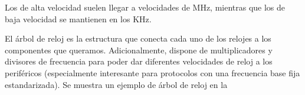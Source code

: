 \documentclass[../main.tex]{subfiles}
\begin{document}
        Los de alta velocidad suelen llegar a velocidades de MHz, mientras que los de baja velocidad se mantienen en los KHz.

        El árbol de reloj es la estructura que conecta cada uno de los relojes a los componentes que queramos. Adicionalmente, dispone de multiplicadores y divisores de frecuencia para poder dar diferentes velocidades de reloj a los periféricos (especialmente interesante para protocolos con una frecuencia base fija estandarizada). Se muestra un ejemplo de árbol de reloj en la 

        \begin{figure}
            \centering
        









\end{figure}
\end{document}
